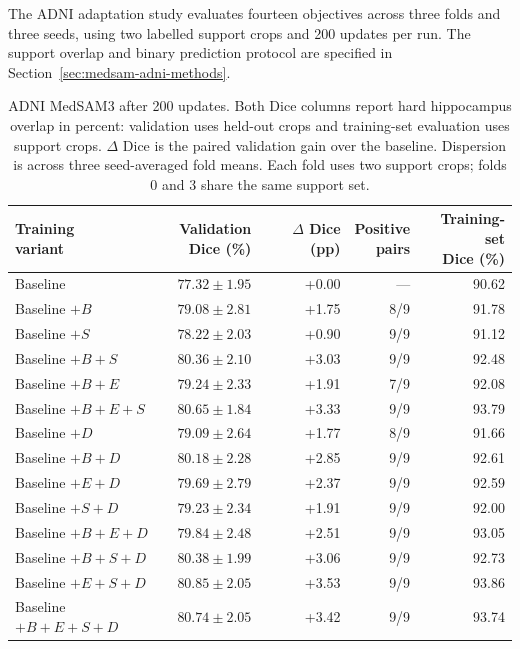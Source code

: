 \documentclass[12pt,a4paper]{article}
\begin{document}
The ADNI adaptation study evaluates fourteen objectives across three
folds and three seeds, using two labelled support crops and 200 updates
per run. The support overlap and binary prediction protocol are
specified in Section~\ref{sec:medsam-adni-methods}.
\begin{table}[htbp]
\centering\small{}
\setlength{\tabcolsep}{5pt}
\renewcommand{\arraystretch}{1.15}
\begin{tabular}{@{}lrrrr@{}}
\hline
\shortstack{Training\\variant} & \shortstack{Validation\\Dice (\%)} & \shortstack{$\Delta$ Dice\\(pp)} & \shortstack{Positive\\pairs} & \shortstack{Training-set\\Dice (\%)} \\
\hline
Baseline & $77.32\pm1.95$ & +0.00 & --- & 90.62 \\
Baseline $+B$ & $79.08\pm2.81$ & +1.75 & 8/9 & 91.78 \\
Baseline $+S$ & $78.22\pm2.03$ & +0.90 & 9/9 & 91.12 \\
Baseline $+B+S$ & $80.36\pm2.10$ & +3.03 & 9/9 & 92.48 \\
Baseline $+B+E$ & $79.24\pm2.33$ & +1.91 & 7/9 & 92.08 \\
Baseline $+B+E+S$ & $80.65\pm1.84$ & +3.33 & 9/9 & 93.79 \\
Baseline $+D$ & $79.09\pm2.64$ & +1.77 & 8/9 & 91.66 \\
Baseline $+B+D$ & $80.18\pm2.28$ & +2.85 & 9/9 & 92.61 \\
Baseline $+E+D$ & $79.69\pm2.79$ & +2.37 & 9/9 & 92.59 \\
Baseline $+S+D$ & $79.23\pm2.34$ & +1.91 & 9/9 & 92.00 \\
Baseline $+B+E+D$ & $79.84\pm2.48$ & +2.51 & 9/9 & 93.05 \\
Baseline $+B+S+D$ & $80.38\pm1.99$ & +3.06 & 9/9 & 92.73 \\
Baseline $+E+S+D$ & $80.85\pm2.05$ & +3.53 & 9/9 & 93.86 \\
Baseline $+B+E+S+D$ & $80.74\pm2.05$ & +3.42 & 9/9 & 93.74 \\
\hline
\end{tabular}
\caption{ADNI MedSAM3 after 200 updates. Both Dice columns report hard
hippocampus overlap in percent: validation uses held-out crops and
training-set evaluation uses support crops. $\Delta$ Dice is the paired
validation gain over the baseline. Dispersion is across three
seed-averaged fold means. Each fold uses two support crops; folds 0 and 3
share the same support set.}
\label{tab:medsam-adni-noaug}
\end{table}
\end{document}
